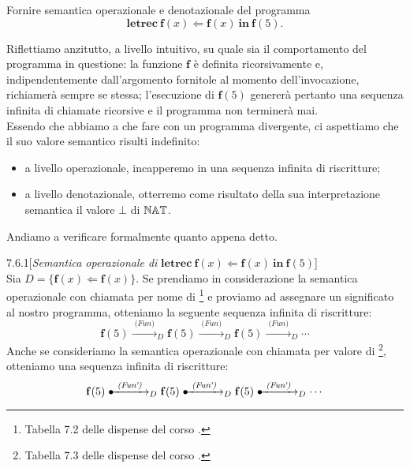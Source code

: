 \begin{tcolorbox} \cite{mssc2016}
Fornire semantica operazionale e denotazionale del programma \[
	\textbf{letrec} \ \mathbf{f}(x) \Leftarrow \mathbf{f}(x) \ \textbf{in} \ \mathbf{f}(5).
\]
\end{tcolorbox}

Riflettiamo anzitutto, a livello intuitivo, su quale sia il comportamento del programma {\SLF} in questione: la funzione $\mathbf{f}$ è definita ricorsivamente e, indipendentemente dall'argomento fornitole al momento dell'invocazione, richiamerà sempre se stessa; l'esecuzione di $\mathbf{f}(5)$ genererà pertanto una sequenza infinita di chiamate ricorsive e il programma non terminerà mai. \\
Essendo che abbiamo a che fare con un programma divergente, ci aspettiamo che il suo valore semantico risulti indefinito:
\begin{itemize}
\item a livello operazionale, incapperemo in una sequenza infinita di riscritture;
\item a livello denotazionale, otterremo come risultato della sua interpretazione semantica il valore $\bot$ di $\mathbb{NAT}$.
\end{itemize}
Andiamo a verificare formalmente quanto appena detto.

\begin{customexe}{7.6.1}[\textit{Semantica operazionale di} $\textbf{letrec} \ \mathbf{f}(x) \Leftarrow \mathbf{f}(x) \ \textbf{in} \ \mathbf{f}(5)$] \label{es:7.6.1} \hfill \\
Sia $D = \{ \mathbf{f}(x) \Leftarrow \mathbf{f}(x) \}$.
Se prendiamo in considerazione la semantica operazionale con chiamata per nome di {\SLF} \footnote{Tabella 7.2 delle dispense del corso \cite{mssc2016}.} e proviamo ad assegnare un significato al nostro programma, otteniamo la seguente sequenza infinita di riscritture:
\[
	\mathbf{f}(5) \xrightarrow{\textit{ (Fun) }}_D \mathbf{f}(5) 
				  \xrightarrow{\textit{ (Fun) }}_D \mathbf{f}(5)
				  \xrightarrow{\textit{ (Fun) }}_D \cdots
\]
Anche se consideriamo la semantica operazionale con chiamata per valore di {\SLF} \footnote{Tabella 7.3 delle dispense del corso \cite{mssc2016}.}, otteniamo una sequenza infinita di riscritture:
\[
	\mathbf{f}(5) \dotxrightarrow{\textit{ (Fun') }}_D \mathbf{f}(5) 
				  \dotxrightarrow{\textit{ (Fun') }}_D \mathbf{f}(5)
				  \dotxrightarrow{\textit{ (Fun') }}_D \cdots
\]
\end{customexe}

